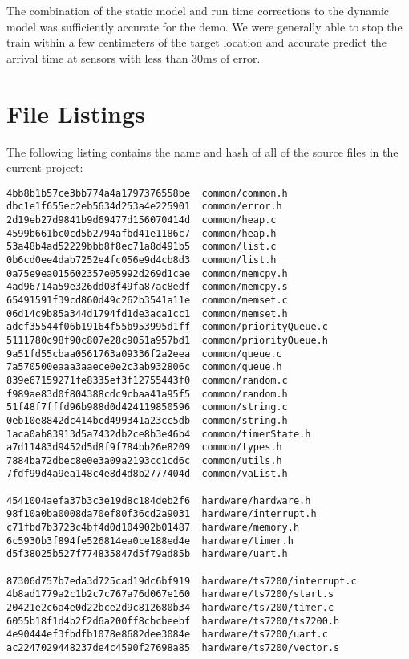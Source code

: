 \documentclass[twoside,a4paper]{refart}
\begin{document}
The combination of the static model and run time corrections to the dynamic model was sufficiently accurate for the demo. We were generally able to stop the train within a few centimeters of the target location and accurate predict the arrival time at sensors with less than 30ms of error.

\section{File Listings}
The following listing contains the name and hash of all of the source files in the current project:
\begin{verbatim}
4bb8b1b57ce3bb774a4a1797376558be  common/common.h
dbc1e1f655ec2eb5634d253a4e225901  common/error.h
2d19eb27d9841b9d69477d156070414d  common/heap.c
4599b661bc0cd5b2794afbd41e1186c7  common/heap.h
53a48b4ad52229bbb8f8ec71a8d491b5  common/list.c
0b6cd0ee4dab7252e4fc056e9d4cb8d3  common/list.h
0a75e9ea015602357e05992d269d1cae  common/memcpy.h
4ad96714a59e326dd08f49fa87ac8edf  common/memcpy.s
65491591f39cd860d49c262b3541a11e  common/memset.c
06d14c9b85a344d1794fd1de3aca1cc1  common/memset.h
adcf35544f06b19164f55b953995d1ff  common/priorityQueue.c
5111780c98f90c807e28c9051a957bd1  common/priorityQueue.h
9a51fd55cbaa0561763a09336f2a2eea  common/queue.c
7a570500eaaa3aaece0e2c3ab932806c  common/queue.h
839e67159271fe8335ef3f12755443f0  common/random.c
f989ae83d0f804388cdc9cbaa41a95f5  common/random.h
51f48f7fffd96b988d0d424119850596  common/string.c
0eb10e8842dc414bcd499341a23cc5db  common/string.h
1aca0ab83913d5a7432db2ce8b3e46b4  common/timerState.h
a7d11483d9452d5d8f9f784bb26e8209  common/types.h
7884ba72dbec8e0e3a09a2193cc1cd6c  common/utils.h
7fdf99d4a9ea148c4e8d4d8b2777404d  common/vaList.h

4541004aefa37b3c3e19d8c184deb2f6  hardware/hardware.h
98f10a0ba0008da70ef80f36cd2a9031  hardware/interrupt.h
c71fbd7b3723c4bf4d0d104902b01487  hardware/memory.h
6c5930b3f894fe526814ea0ce188ed4e  hardware/timer.h
d5f38025b527f774835847d5f79ad85b  hardware/uart.h

87306d757b7eda3d725cad19dc6bf919  hardware/ts7200/interrupt.c
4b8ad1779a2c1b2c7c767a76d067e160  hardware/ts7200/start.s
20421e2c6a4e0d22bce2d9c812680b34  hardware/ts7200/timer.c
6055b18f1d4b2f2d6a200ff8cbcbeebf  hardware/ts7200/ts7200.h
4e90444ef3fbdfb1078e8682dee3084e  hardware/ts7200/uart.c
ac2247029448237de4c4590f27698a85  hardware/ts7200/vector.s


\end{verbatim}
\end{document}
